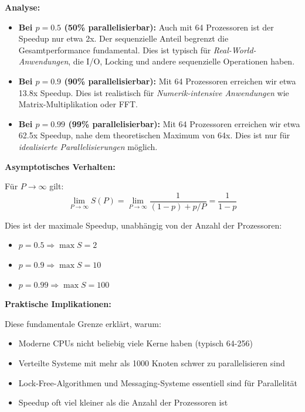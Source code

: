 \documentclass[a4paper,11pt]{article}
\theoremstyle{definition}
\begin{document}
\textbf{Analyse:}

\begin{itemize}
    \item \textbf{Bei $p = 0.5$ (50\% parallelisierbar):}
          Auch mit 64 Prozessoren ist der Speedup nur etwa 2x. Der sequenzielle Anteil begrenzt 
          die Gesamtperformance fundamental. Dies ist typisch für \emph{Real-World-Anwendungen}, 
          die I/O, Locking und andere sequenzielle Operationen haben.
    
    \item \textbf{Bei $p = 0.9$ (90\% parallelisierbar):}
          Mit 64 Prozessoren erreichen wir etwa 13.8x Speedup. Dies ist realistisch für 
          \emph{Numerik-intensive Anwendungen} wie Matrix-Multiplikation oder FFT.
    
    \item \textbf{Bei $p = 0.99$ (99\% parallelisierbar):}
          Mit 64 Prozessoren erreichen wir etwa 62.5x Speedup, nahe dem theoretischen Maximum von 64x. 
          Dies ist nur für \emph{idealisierte Parallelisierungen} möglich.
\end{itemize}

\textbf{Asymptotisches Verhalten:}

Für $P \to \infty$ gilt:
\[
    \lim_{P \to \infty} S(P) = \lim_{P \to \infty} \frac{1}{(1-p) + p/P} = \frac{1}{1-p}
\]

Dies ist der maximale Speedup, unabhängig von der Anzahl der Prozessoren:
\begin{itemize}
    \item $p = 0.5 \Rightarrow \max S = 2$
    \item $p = 0.9 \Rightarrow \max S = 10$
    \item $p = 0.99 \Rightarrow \max S = 100$
\end{itemize}

\textbf{Praktische Implikationen:}

Diese fundamentale Grenze erklärt, warum:
\begin{itemize}
    \item Moderne CPUs nicht beliebig viele Kerne haben (typisch 64-256)
    \item Verteilte Systeme mit mehr als 1000 Knoten schwer zu parallelisieren sind
    \item Lock-Free-Algorithmen und Messaging-Systeme essentiell sind für Parallelität
    \item Speedup oft viel kleiner als die Anzahl der Prozessoren ist
\end{itemize}
\end{document}
